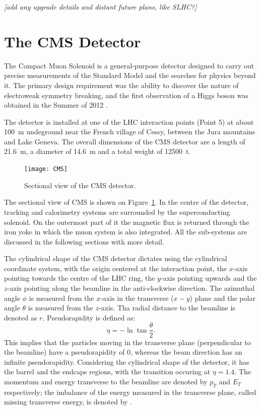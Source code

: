 \textit{[add any upgrade details and distant future plans, like SLHC?]}

\section{The CMS Detector}
The Compact Muon Solenoid \cite{CMS} is a general-purpose detector designed to carry out precise measurements of the
Standard Model and the searches for physics beyond it. The primary design requirement was the ability to
discover the nature of electroweak symmetry breaking, and the first observation of a Higgs boson was obtained in the
Summer of 2012 \cite{CMS_Higgs}.

The detector is installed at one of the LHC interaction points (Point 5) at about \SI{100}{\metre} undeground near the
French village of Cessy, between the Jura mountains and Lake Geneva. The overall dimensions of the CMS detector are a
length of \SI{21.6}{\metre}, a diameter of \SI{14.6}{\metre} and a total weight of \SI{12500}{\tonne}.

\begin{figure}[htbp]
  \begin{center}
    \leavevmode
    \texttt{[image: CMS]}
    \caption{Sectional view of the CMS detector.}
    \label{CMS}
  \end{center}
\end{figure}

The sectional view of CMS is shown on Figure~\ref{CMS}. In the centre of the detector, tracking and calorimetry systems
are surrounded by the superconducting solenoid. On the outermost part of it the magnetic flux is returned through the
iron yoke in which the muon system is also integrated. All the sub-systems are discussed in the following sections with
more detail.

The cylindrical shape of the CMS detector dictates using the cylindrical coordinate system, with the origin centered at
the interaction point, the $x$-axis pointing towards the centre of the LHC ring, the $y$-axis pointing upwards and the
$z$-axis pointing along the beamline in the anti-clockwise direction. The azimuthal angle $\phi$ is measured from the
$x$-axis in the transverse ($x-y$) plane and the polar angle $\theta$ is measured from the $z$-axis. Tha radial distance
to the beamline is denoted as $r$. Pseudorapidity is defined as:
\begin{equation}
  \eta = - \ln{\tan{\frac{\theta}{2}}}.
\end{equation}
This implies that the particles moving in the transverse plane (perpendicular to the beamline) have a pseudorapidity of
0, whereas the beam direction has an infinite pseudorapidity. Considering the cylindrical shape of the detector, it has
the barrel and the endcaps regions, with the transition occuring at $\eta = 1.4$. The momentum and energy transverse to
the beamline are denoted by $p_T$ and $E_T$ respectively; the imbalance of the energy measured in the transverse plane,
called missing transverse energy, is denoted by \ETm.

